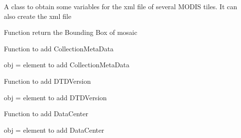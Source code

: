 \documentclass[a4paper,11pt,oneside]{sphinxmanual}
\begin{document}
\begin{fulllineitems}
\label{pymodis/pymodis:pymodis.parsemodis.parseModisMulti}
A class to obtain some variables for the xml file of several MODIS tiles.
It can also create the xml file

\begin{fulllineitems}
\label{pymodis/pymodis:pymodis.parsemodis.parseModisMulti.valBound}
Function return the Bounding Box of mosaic

\end{fulllineitems}


\begin{fulllineitems}
\label{pymodis/pymodis:pymodis.parsemodis.parseModisMulti.valCollectionMetaData}
Function to add CollectionMetaData

obj = element to add CollectionMetaData

\end{fulllineitems}


\begin{fulllineitems}
\label{pymodis/pymodis:pymodis.parsemodis.parseModisMulti.valDTD}
Function to add DTDVersion

obj = element to add DTDVersion

\end{fulllineitems}


\begin{fulllineitems}
\label{pymodis/pymodis:pymodis.parsemodis.parseModisMulti.valDataCenter}
Function to add DataCenter

obj = element to add DataCenter

\end{fulllineitems}



\end{fulllineitems}
\end{document}
